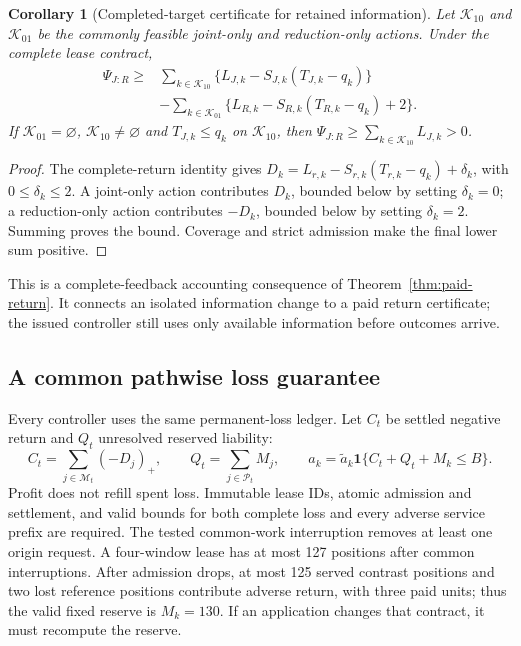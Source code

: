 \documentclass[10pt]{article}
\newtheorem{corollary}{Corollary}
\begin{document}
\begin{corollary}[Completed-target certificate for retained information]
\label{cor:paid-retained-information}
Let $\mathcal K_{10}$ and $\mathcal K_{01}$ be the commonly feasible
joint-only and reduction-only actions. Under the complete lease contract,
\begin{equation}
\begin{aligned}
 \Psi_{J:R}\geq{}&
 \sum_{k\in\mathcal K_{10}}\{L_{J,k}-S_{J,k}(T_{J,k}-q_k)\}\\
 &-\sum_{k\in\mathcal K_{01}}\{L_{R,k}-S_{R,k}(T_{R,k}-q_k)+2\}.
\end{aligned}
 \label{eq:paid-information-certificate}
\end{equation}
If $\mathcal K_{01}=\varnothing$, $\mathcal K_{10}\ne\varnothing$ and
$T_{J,k}\leq q_k$ on $\mathcal K_{10}$, then
$\Psi_{J:R}\geq\sum_{k\in\mathcal K_{10}}L_{J,k}>0$.
\end{corollary}
\begin{proof}
The complete-return identity gives
$D_k=L_{r,k}-S_{r,k}(T_{r,k}-q_k)+\delta_k$, with
$0\leq\delta_k\leq2$. A joint-only action contributes $D_k$, bounded
below by setting $\delta_k=0$; a reduction-only action contributes $-D_k$,
bounded below by setting $\delta_k=2$. Summing proves the bound.
Coverage and strict admission make the final lower sum positive.
\end{proof}
This is a complete-feedback accounting consequence of
Theorem~\ref{thm:paid-return}. It connects an isolated information change
to a paid return certificate; the issued controller still uses only
available information before outcomes arrive.

\subsection{A common pathwise loss guarantee}
Every controller uses the same permanent-loss ledger. Let $C_t$ be settled
negative return and $Q_t$ unresolved reserved liability:
\begin{equation}
 C_t=\sum_{j\in\mathcal M_t}(-D_j)_+,\qquad
 Q_t=\sum_{j\in\mathcal P_t}M_j,\qquad
 a_k=\widetilde a_k\mathbf1\{C_t+Q_t+M_k\leq B\}.
 \label{eq:loss-budget-gate}
\end{equation}
Profit does not refill spent loss. Immutable lease IDs, atomic admission
and settlement, and valid bounds for both complete loss and every adverse
service prefix are required. The tested common-work interruption removes
at least one origin request. A four-window lease has at most 127 positions after common interruptions.
After admission drops, at most 125 served contrast positions and two lost
reference positions contribute adverse return, with three paid units;
thus the valid fixed reserve is $M_k=130$. If an application changes that
contract, it must recompute the reserve.
\end{document}
